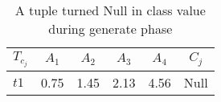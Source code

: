 \begin{table}[h]
\caption{A tuple turned Null in class value during generate phase}
\label{table:table2_5}
\centering
\begin{tabular}{lccccc}
	\toprule
	\textbf{$\mathit{T_{c_j}}$} & \textbf{$\mathit{A_1}$} & \textbf{$\mathit{A_2}$} & \textbf{$\mathit{A_3}$} & \textbf{$\mathit{A_4}$} & \textbf{$\mathit{C_j}$} \\
	\midrule
	$\mathit{t1}$ & 0.75 & 1.45 & 2.13 & 4.56 & Null \\
	\bottomrule
\end{tabular} 
\end{table}
